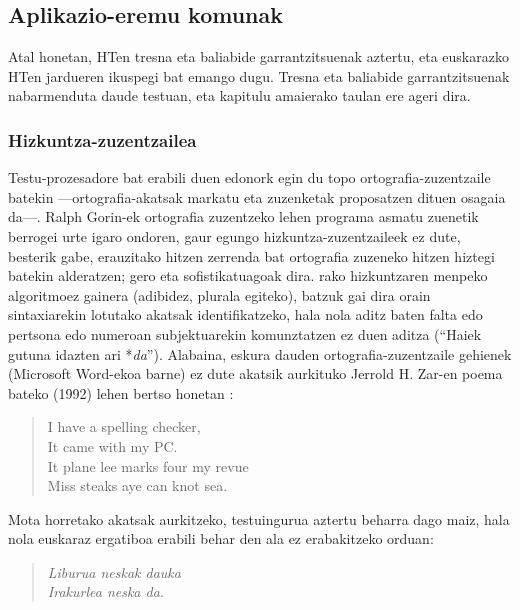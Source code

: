 \begin{multicols}{2}
\subsection{Aplikazio-eremu komunak} 
Atal honetan, HTen tresna eta baliabide garrantzitsuenak aztertu, eta euskarazko HTen jardueren ikuspegi bat emango dugu. Tresna eta baliabide garrantzitsuenak nabarmenduta daude testuan, eta kapitulu amaierako taulan ere ageri dira.

\subsubsection{Hizkuntza-zuzentzailea}
   Testu-prozesadore bat erabili duen edonork egin du topo ortografia-zuzentzaile batekin —ortografia-akatsak markatu eta zuzenketak proposatzen dituen osagaia da—. Ralph Gorin-ek ortografia zuzentzeko lehen programa asmatu zuenetik berrogei urte igaro ondoren, gaur egungo hizkuntza-zuzentzaileek ez dute, besterik gabe, erauzitako hitzen zerrenda bat ortografia zuzeneko hitzen hiztegi batekin alderatzen; gero eta sofistikatuagoak dira. rako hizkuntzaren menpeko algoritmoez gainera (adibidez, plurala egiteko), batzuk gai dira orain sintaxiarekin lotutako akatsak identifikatzeko, hala nola aditz baten falta edo pertsona edo numeroan subjektuarekin komunztatzen ez duen aditza (“Haiek gutuna idazten ari *\textit{da}”). Alabaina, eskura dauden ortografia-zuzentzaile gehienek (Microsoft Word-ekoa barne) ez dute akatsik aurkituko Jerrold H. Zar-en poema bateko (1992) lehen bertso honetan \cite{zar1}: 

\begin{quote}
  I have a spelling checker,\\
  It came with my PC.\\
  It plane lee marks four my revue\\
  Miss steaks aye can knot sea.
\end{quote}

Mota horretako akatsak aurkitzeko, testuingurua aztertu beharra dago maiz, hala nola euskaraz ergatiboa erabili behar den ala ez erabakitzeko orduan:

\begin{quote}
  \textit{Liburua neskak dauka }\\
  \textit{Irakurlea neska da.}
\end{quote}


\end{multicols}
